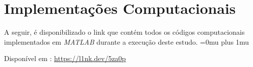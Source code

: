 \chapter{Implementações Computacionais}\label{cap:ApendiceA}

A seguir, é disponibilizado o link que contém todos os códigos computacionais implementados em \textit{MATLAB} durante a execução deste estudo. 
\Urlmuskip=0mu plus 1mu
\def\UrlBreaks{\do\/\do-}

Disponível em : \url{https://l1nk.dev/5za0p}
